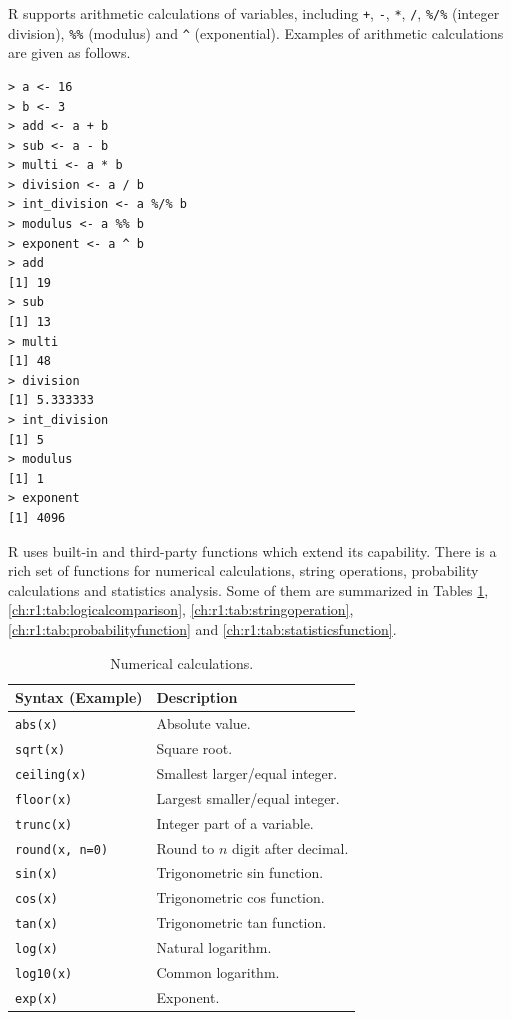R supports arithmetic calculations of variables, including \verb|+|, \verb|-|, \verb|*|, \verb|/|, \verb|%/%| (integer division), \verb|%%| (modulus) and \verb|^| (exponential). Examples of arithmetic calculations are given as follows.
\begin{lstlisting}
> a <- 16
> b <- 3
> add <- a + b
> sub <- a - b
> multi <- a * b
> division <- a / b
> int_division <- a %/% b
> modulus <- a %% b
> exponent <- a ^ b
> add
[1] 19
> sub
[1] 13
> multi
[1] 48
> division
[1] 5.333333
> int_division
[1] 5
> modulus
[1] 1
> exponent
[1] 4096
\end{lstlisting}

R uses built-in and third-party functions which extend its capability. There is a rich set of functions for numerical calculations, string operations, probability calculations and statistics analysis. Some of them are summarized in Tables \ref{ch:r1:tab:numericalcalculation}, \ref{ch:r1:tab:logicalcomparison}, \ref{ch:r1:tab:stringoperation}, \ref{ch:r1:tab:probabilityfunction} and \ref{ch:r1:tab:statisticsfunction}.

\begin{table}
  \centering \caption{Numerical calculations.}\label{ch:r1:tab:numericalcalculation}
  \begin{tabularx}{\textwidth}{lX}
    \hline
    Syntax (Example) & Description \\ \hline
    \verb|abs(x)| & Absolute value. \\
    \verb|sqrt(x)| & Square root. \\
    \verb|ceiling(x)| & Smallest larger/equal integer. \\
    \verb|floor(x)| & Largest smaller/equal integer. \\
    \verb|trunc(x)| & Integer part of a variable. \\
    \verb|round(x, n=0)| & Round to $n$ digit after decimal. \\
    \verb|sin(x)| & Trigonometric sin function. \\
    \verb|cos(x)| & Trigonometric cos function. \\
    \verb|tan(x)| & Trigonometric tan function. \\
    \verb|log(x)| & Natural logarithm. \\
    \verb|log10(x)| & Common logarithm. \\
    \verb|exp(x)| & Exponent. \\
    \hline
  \end{tabularx}
\end{table}

